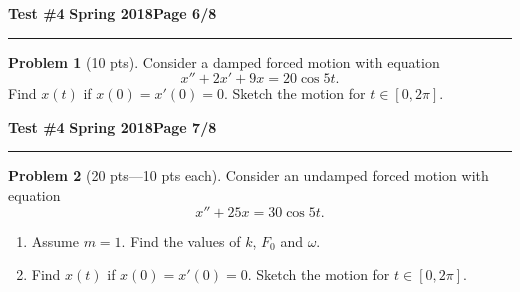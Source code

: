 \documentclass[12pt]{article}
\theoremstyle{definition}
\newtheorem{problem}{Problem}
\begin{document}
\hfill{\large\bf Test \#4}\hfill{\large\bf
  Spring 2018}\hfill{\large\bf Page 6/8}\hrule

\bigskip
\begin{problem}[10 pts]
Consider a damped forced motion with equation 
\begin{equation*}
x'' + 2x' + 9x = 20\cos 5t.
\end{equation*}
Find $x(t)$ if $x(0)=x'(0)=0$.  Sketch the motion for $t \in [0,2\pi]$.
  \vspace{18cm}
  \begin{flushright}
  \end{flushright}
\end{problem}
\newpage

\hfill{\large\bf Test \#4}\hfill{\large\bf
  Spring 2018}\hfill{\large\bf Page 7/8}\hrule

\bigskip
\begin{problem}[20 pts---10 pts each]
Consider an undamped forced motion with equation 
\begin{equation*}
x''+25x=30\cos 5t.
\end{equation*}
\begin{enumerate}
  \item Assume $m=1$.  Find the values of $k$, $F_0$ and $\omega$.
  \begin{flushright}
  \end{flushright}
  \item Find $x(t)$ if $x(0)=x'(0)=0$.  Sketch the motion for $t \in [0,2\pi]$.
  \vspace{16cm}
  \begin{flushright}
  \end{flushright}
\end{enumerate}
\end{problem}
\newpage
\end{document}
